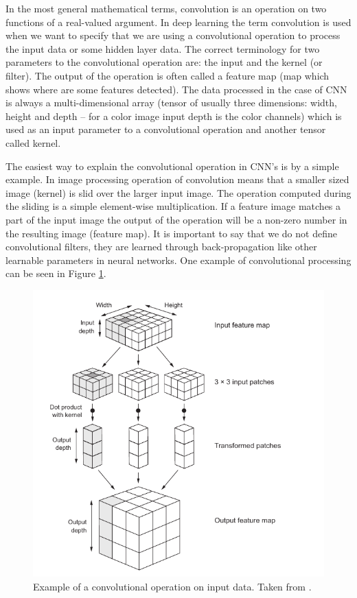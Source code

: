 \documentclass[b5paper]{book}
\let\cite\parencite
\begin{document}
In the most general mathematical terms, convolution is an operation on two functions of a real-valued argument. In deep learning the term convolution is used when we want to specify that we are using a convolutional operation to process the input data or some hidden layer data. The correct terminology for two parameters to the convolutional operation are: the input and the kernel (or filter). The output of the operation is often called a feature map (map which shows where are some features detected). The data processed in the case of CNN is always a multi-dimensional array (tensor of usually three dimensions: width, height and depth -- for a color image input depth is the color channels) which is used as an input parameter to a convolutional operation and another tensor called kernel. 

The easiest way to explain the convolutional operation in CNN's is by a simple example. In image processing operation of convolution means that a smaller sized image (kernel) is slid over the larger input image. The operation computed during the sliding is a simple element-wise multiplication. If a feature image matches a part of the input image the output of the operation will be a non-zero number in the resulting image (feature map). It is important to say that we do not define convolutional filters, they are learned through back-propagation like other learnable parameters in neural networks. One example of convolutional processing can be seen in Figure \ref{fig:conv}.

\begin{figure}
    \centering
    \includegraphics[scale=0.5]{figures/conv-chollet.png}
    \caption{Example of a convolutional operation on input data. Taken from \cite{chollet2018deep}.}
    \label{fig:conv}
\end{figure}
\end{document}
